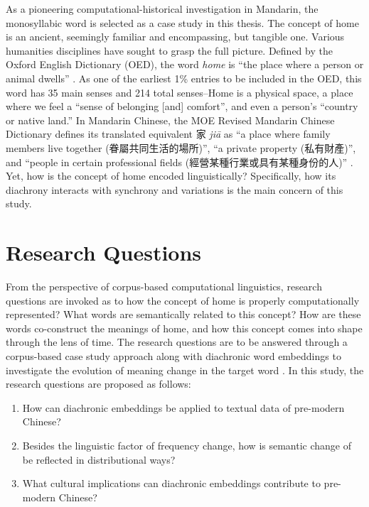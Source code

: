 As a pioneering computational-historical investigation in Mandarin, the monosyllabic word  is selected as a case study in this thesis. The concept of home is an ancient, seemingly familiar and encompassing, but tangible one. Various humanities disciplines have sought to grasp the full picture. Defined by the Oxford English Dictionary (OED), the word \textit{home} is ``the place where a person or animal dwells'' . As one of the earliest 1\% entries to be included in the OED, this word has \num{35} main senses and \num{214} total senses--Home is a physical space, a place where we feel a ``sense of belonging [and] comfort'', and even a person's ``country or native land.'' In Mandarin Chinese, the MOE Revised Mandarin Chinese Dictionary defines its translated equivalent 家 \textit{jiā} as ``a place where family members live together (眷屬共同生活的場所)'', ``a private property (私有財產)'', and ``people in certain professional fields (經營某種行業或具有某種身份的人)'' . Yet, how is the concept of home encoded linguistically? Specifically, how its diachrony interacts with synchrony and variations is the main concern of this study.

\section{Research Questions}
From the perspective of corpus-based computational linguistics, research questions are invoked as to how the concept of home is properly computationally represented? What words are semantically related to this concept? How are these words co-construct the meanings of home, and how this concept comes into shape through the lens of time. The research questions are to be answered through a corpus-based case study approach along with diachronic word embeddings to investigate the evolution of meaning change in the target word \jia\rspace. In this study, the research questions are proposed as follows:

\begin{enumerate}[label={(\arabic*)},nolistsep]
    \item How can diachronic embeddings be applied to textual data of pre-modern Chinese?
    \item Besides the linguistic factor of frequency change, how is semantic change of \jia be reflected in distributional ways?
    \item What cultural implications can diachronic embeddings contribute to pre-modern Chinese?
\end{enumerate}

